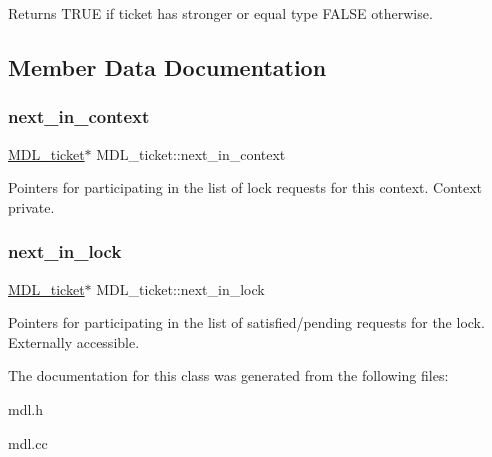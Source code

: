 \begin{DoxyReturn}{Returns}
T\+R\+UE if ticket has stronger or equal type F\+A\+L\+SE otherwise. 
\end{DoxyReturn}


\subsection{Member Data Documentation}
\mbox{\label{classMDL__ticket_a74155707577dfd12cc7f47229e4f0d17}} 
\subsubsection{\texorpdfstring{next\+\_\+in\+\_\+context}{next\_in\_context}}
{\footnotesize\ttfamily \mbox{\hyperlink{classMDL__ticket}{M\+D\+L\+\_\+ticket}}$\ast$ M\+D\+L\+\_\+ticket\+::next\+\_\+in\+\_\+context}

Pointers for participating in the list of lock requests for this context. Context private. \mbox{\label{classMDL__ticket_ad9c009e5c097d2159dd142aa7f58e010}} 
\subsubsection{\texorpdfstring{next\+\_\+in\+\_\+lock}{next\_in\_lock}}
{\footnotesize\ttfamily \mbox{\hyperlink{classMDL__ticket}{M\+D\+L\+\_\+ticket}}$\ast$ M\+D\+L\+\_\+ticket\+::next\+\_\+in\+\_\+lock}

Pointers for participating in the list of satisfied/pending requests for the lock. Externally accessible. 

The documentation for this class was generated from the following files\+:\begin{DoxyCompactItemize}
\item 
mdl.\+h\item 
mdl.\+cc\end{DoxyCompactItemize}
